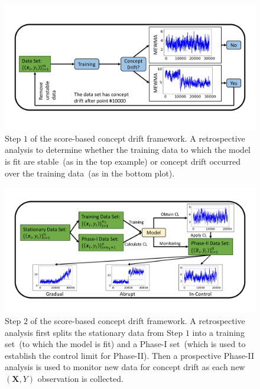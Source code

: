 \documentclass[twoside,11pt]{article}
\begin{document}
\begin{figure}[!htbp]
\centering
\includegraphics[width = 1\linewidth, trim=.35in .69in .35in .69in, clip]{../figures/v14/flow_chart/Retrospective_1.png}
\caption{Step $1$ of the score-based concept drift framework. A retrospective analysis to determine whether the training data to which the model is fit are stable~(as in the top example) or concept drift occurred over the training data~(as in the bottom plot).}
  \label{fig:proc_mon_score_retro}
\end{figure}

\begin{figure}
\centering
\includegraphics[width = 1\linewidth, trim=.35in .49in .35in .49in, clip]{../figures/v14/flow_chart/Monitoring_1.png}
\caption{Step $2$ of the score-based concept drift framework. A retrospective analysis first splits the stationary data from Step $1$ into a training set~(to which the model is fit) and a Phase-I set~(which is used to establish the control limit for Phase-II). Then a prospective Phase-II analysis is used to monitor new data for concept drift as each new $(\bm{X}, Y)$ observation is collected.}
\label{fig:proc_mon_score_monitoring}
\end{figure}
\end{document}
